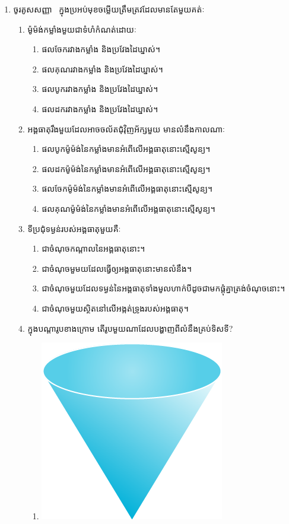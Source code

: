 \documentclass{officialexam}
\begin{document}
	\begin{enumerate}[I]
		\item {\color{khtug}\sffamily ចូរគូសសញ្ញា \tick ~ក្នុងប្រអប់មុខចម្លើយត្រឹមត្រវដែលមានតែមួយគត់ៈ}
		\begin{enumerate}[m]
			\item ម៉ូម៉ង់កម្លាំងមួយជាទំហំកំណត់ដោយៈ
			\begin{multicols}{2}
				\begin{enumerate}[bk]
					\item ផលចែករវាងកម្លាំង និងប្រវែងដៃឃ្នាស់។
					\item ផលគុណរវាងកម្លាំង និងប្រវែងដៃឃ្នាស់។
					\item ផលបូករវាងកម្លាំង និងប្រវែងដៃឃ្នាស់។
					\item ផលដករវាងកម្លាំង និងប្រវែងដៃឃ្នាស់។
				\end{enumerate}
			\end{multicols}
			\item អង្គធាតុរឹងមួយដែលអាចចល័តជុំវុិញអ័ក្សមួយ មានលំនឹងកាលណាៈ
			\begin{enumerate}[bk]
				\item ផលបូកម៉ូម៉ង់នៃកម្លាំងមានអំពើលើអង្គធាតុនោះស្មើសូន្យ។
				\item ផលដកម៉ូម៉ង់នៃកម្លាំងមានអំពើលើអង្គធាតុនោះស្មើសូន្យ។
				\item ផលចែកម៉ូម៉ង់នៃកម្លាំងមានអំពើលើអង្គធាតុនោះស្មើសូន្យ។
				\item ផលគុណម៉ូម៉ង់នៃកម្លាំងមានអំពើលើអង្គធាតុនោះស្មើសូន្យ។
			\end{enumerate}
			\item ទីប្រជុំទម្ងន់របស់អង្គធាតុមួយគឺៈ
			\begin{enumerate}[bk]
				\item ជាចំណុចកណ្តាលនៃអង្គធាតុនោះ។
				\item ជាចំណុចមួមយដែលធ្វើឲ្យអង្គធាតុនោះមានលំនឹង។
				\item ជាចំណុចមួយដែលទម្ងន់នៃអង្គធាតុទាំងមូលហាក់បីដូចជាមកផ្តុំគ្នាត្រង់ចំណុចនោះ។
				\item ជាចំណុចមួយស្ថិតនៅលើអង្កត់ទ្រូងរបស់អង្គធាតុ។
			\end{enumerate}
			\item ក្នុងបណ្តារូបខាងក្រោម តើរូបមួយណាដែលបង្ហាញពីលំនឹងគ្រប់ទិសទី?
			\begin{multicols}{4}
				\begin{enumerate}[bk]
					\item \includegraphics[scale=1]{05}

\end{enumerate}
\end{multicols}
\end{enumerate}
\end{enumerate}
\end{document}
